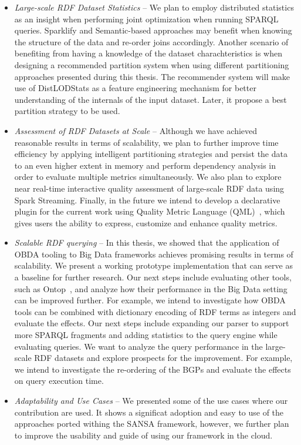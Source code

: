 \begin{itemize}
    \item \textit{Large-scale RDF Dataset Statistics} -- 
    We plan to employ distributed statistics as an insight when performing joint optimization when running SPARQL queries. 
    Sparklify and Semantic-based approaches may benefit when knowing the structure of the data and re-order joins accordingly.
    Another scenario of benefiting from having a knowledge of the dataset charachteristics is when designing a recommended partition system when using different partitioning approaches presented during this thesis.
    The recommender system will make use of DistLODStats as a feature engineering mechanism for better understanding of the internals of the input dataset. 
    Later, it propose a best partition strategy to be used.
    \item \textit{Assessment of RDF Datasets at Scale} -- 
    Although we have achieved reasonable results in terms of scalability, we plan to further improve time efficiency by applying intelligent partitioning strategies and persist the data to an even higher extent in memory and perform dependency analysis in order to evaluate multiple metrics simultaneously. 
    We also plan to explore near real-time interactive quality assessment of large-scale RDF data using Spark Streaming.
    Finally, in the future we intend to develop a declarative plugin for the current work using Quality Metric Language (QML)~\cite{debattista2016luzzu}, which gives users the ability to express, customize and enhance quality metrics.
    \item \textit{Scalable RDF querying} -- 
    In this thesis, we showed that the application of OBDA tooling to Big Data frameworks achieves promising results in terms of scalability. 
    We present a working prototype implementation that can serve as a baseline for further research. 
    Our next steps include evaluating other tools, such as Ontop~\cite{Calvanese2017OntopAS}, and analyze how their performance in the Big Data setting can be improved further. 
    For example, we intend to investigate how OBDA tools can be combined with dictionary encoding of RDF terms as integers and evaluate the effects.
    Our next steps include expanding our parser to support more SPARQL fragments and adding statistics to the query engine while evaluating queries. 
    We want to analyze the query performance in the large-scale RDF datasets and explore prospects for the improvement.
    For example, we intend to investigate the re-ordering of the BGPs and evaluate the effects on query execution time.
    \item \textit{Adaptability and Use Cases} -- 
    We presented some of the use cases where our contribution are used. 
    It shows a significat adoption and easy to use of the approaches ported withing the SANSA framework, however, we further plan to improve the usability and guide of using our framework in the cloud.
\end{itemize}

